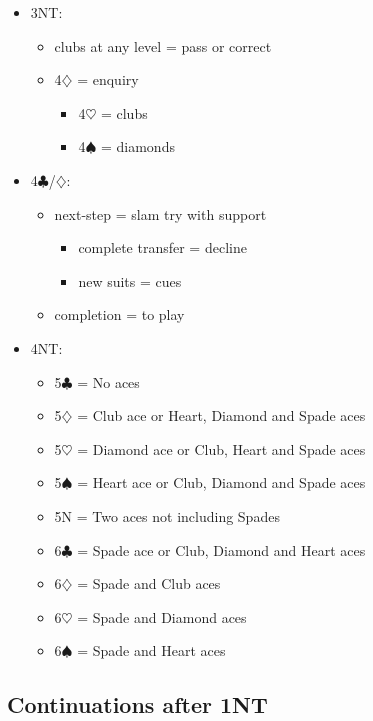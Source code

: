 \documentclass[a4paper,14pt]{extarticle}
\begin{document}
\begin{itemize}
\item 3NT:
	\begin{itemize}
	\item clubs at any level = pass or correct
	\item 4$\diamondsuit$ = enquiry
		\begin{itemize}
		\item 4$\heartsuit$ = clubs
		\item 4$\spadesuit$ = diamonds
		\end{itemize}
	\end{itemize}

\item 4$\clubsuit$/$\diamondsuit$:
	\begin{itemize}
	\item next-step = slam try with support
		\begin{itemize}
		\item complete transfer = decline
		\item new suits = cues
		\end{itemize}
	\item completion = to play
	\end{itemize}

\item 4NT:
	\begin{itemize}
	\item 5$\clubsuit$ = No aces
	\item 5$\diamondsuit$ = Club ace or Heart, Diamond and Spade aces
	\item 5$\heartsuit$ = Diamond ace or Club, Heart and Spade aces
	\item 5$\spadesuit$ = Heart ace or Club, Diamond and Spade aces
	\item 5N = Two aces not including Spades
	\item 6$\clubsuit$ = Spade ace or Club, Diamond and Heart aces
	\item 6$\diamondsuit$ = Spade and Club aces
	\item 6$\heartsuit$ = Spade and Diamond aces
	\item 6$\spadesuit$ = Spade and Heart aces
	\end{itemize}

\end{itemize}

\newpage

\subsection{Continuations after 1NT}
\label{sec:resp:1n}
\end{document}
